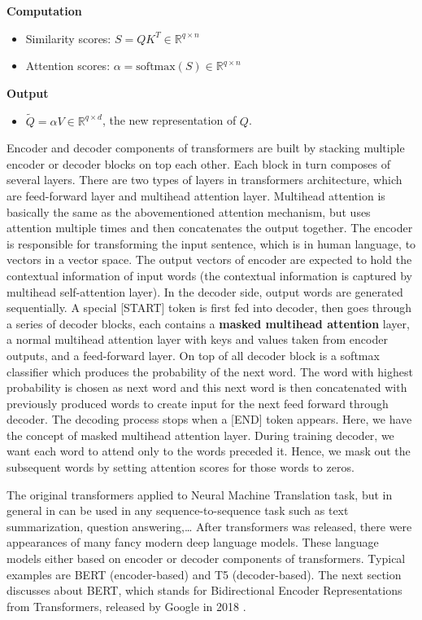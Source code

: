 \documentclass[12pt, sort&compress]{report}
\begin{document}
\par \textbf{Computation}
\begin{itemize}
	\item Similarity scores: $S = QK^T \in \mathbb{R}^{q \times n}$
	\item Attention scores: $\mathbb{\alpha} = \text{softmax}(S) \in \mathbb{R}^{q \times n}$
\end{itemize}
\par \textbf{Output}
\begin{itemize}
	\item $\tilde{Q} = \mathbb{\alpha}V \in \mathbb{R}^{q \times d}$, the new representation of $Q$.
\end{itemize}
\par Encoder and decoder components of transformers are built by stacking multiple encoder or decoder blocks on top each other. Each block in turn composes of several layers. There are two types of layers in transformers architecture, which are feed-forward layer and multihead attention layer. Multihead attention is basically the same as the abovementioned attention mechanism, but uses attention multiple times and then concatenates the output together. The encoder is responsible for transforming the input sentence, which is in human language, to vectors in a vector space. The output vectors of encoder are expected to hold the contextual information of input words (the contextual information is captured by multihead self-attention layer). In the decoder side, output words are generated sequentially. A special [START] token is first fed into  decoder, then goes through a series of decoder blocks, each contains a \textbf{masked multihead attention} layer, a normal multihead attention layer with keys and values taken from encoder outputs, and a feed-forward layer. On top of all decoder block is a softmax classifier which produces the probability of the next word. The word with highest probability is chosen as next word and this next word is then concatenated with previously produced words to create input for the next feed forward through decoder. The decoding process stops when a [END] token appears. Here, we have the concept of masked multihead attention layer. During training decoder, we want each word to attend only to the words preceded it. Hence, we mask out the subsequent words by setting attention scores for those words to zeros. 
\par The original transformers applied to Neural Machine Translation task, but in general in can be used in any sequence-to-sequence task such as text summarization, question answering,… After transformers was released, there were appearances of many fancy modern deep language models. These language models either based on encoder or decoder components of transformers. Typical examples are BERT (encoder-based) and T5 (decoder-based). The next section discusses about BERT, which stands for Bidirectional Encoder Representations from Transformers, released by Google in 2018 \cite{devlin2018bert}.
\end{document}
